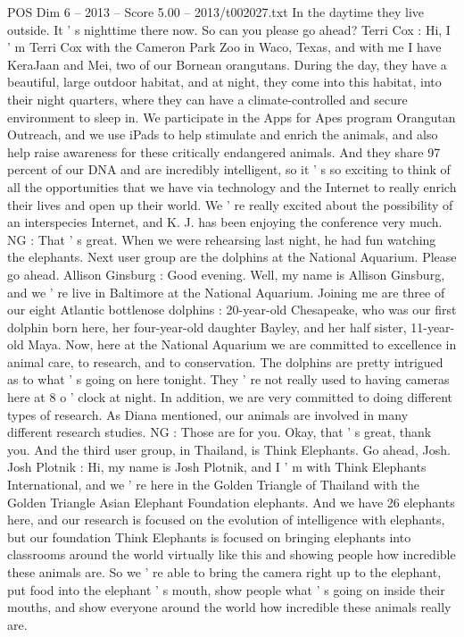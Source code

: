 \begin{textsample}{POS Dim 6 – 2013 – Score 5.00 – 2013/t002027.txt}
In the daytime they live outside.
It ' s nighttime there now.
So can you please go ahead?
Terri Cox : Hi, I ' m Terri Cox with the Cameron Park Zoo in Waco, Texas, and with me I have KeraJaan and Mei, two of our Bornean orangutans.
During the day, they have a beautiful, large outdoor habitat, and at night, they come into this habitat, into their night quarters, where they can have a climate-controlled and secure environment to sleep in.
We participate in the Apps for Apes program Orangutan Outreach, and we use iPads to help stimulate and enrich the animals, and also help raise awareness for these critically endangered animals.
And they share 97 percent of our DNA and are incredibly intelligent, so it ' s so exciting to think of all the opportunities that we have via technology and the Internet to really enrich their lives and open up their world.
We ' re really excited about the possibility of an interspecies Internet, and K.
J. has been enjoying the conference very much.
NG : That ' s great.
When we were rehearsing last night, he had fun watching the elephants.
Next user group are the dolphins at the National Aquarium.
Please go ahead.
Allison Ginsburg : Good evening.
Well, my name is Allison Ginsburg, and we ' re live in Baltimore at the National Aquarium.
Joining me are three of our eight Atlantic bottlenose dolphins : 20-year-old Chesapeake, who was our first dolphin born here, her four-year-old daughter Bayley, and her half sister, 11-year-old Maya.
Now, here at the National Aquarium we are committed to excellence in animal care, to research, and to conservation.
The dolphins are pretty intrigued as to what ' s going on here tonight.
They ' re not really used to having cameras here at 8 o ' clock at night.
In addition, we are very committed to doing different types of research.
As Diana mentioned, our animals are involved in many different research studies.
NG : Those are for you.
Okay, that ' s great, thank you.
And the third user group, in Thailand, is Think Elephants.
Go ahead, Josh.
Josh Plotnik : Hi, my name is Josh Plotnik, and I ' m with Think Elephants International, and we ' re here in the Golden Triangle of Thailand with the Golden Triangle Asian Elephant Foundation elephants.
And we have 26 elephants here, and our research is focused on the evolution of intelligence with elephants, but our foundation Think Elephants is focused on bringing elephants into classrooms around the world virtually like this and showing people how incredible these animals are.
So we ' re able to bring the camera right up to the elephant, put food into the elephant ' s mouth, show people what ' s going on inside their mouths, and show everyone around the world how incredible these animals really are.

\end{textsample}
